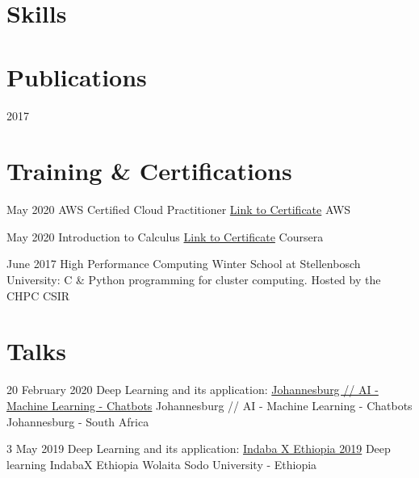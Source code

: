 \documentclass[letterpaper]{moderncv}        %
\begin{document}
\section{Skills}
			
\vspace{1mm}


	
\section{Publications}
\cventry
{2017}
{}
{}
{}
{}
{}

\section{Training \& Certifications}

\cventry
{May 2020}
{AWS Certified Cloud Practitioner}
{\href{https://www.certmetrics.com/amazon/public/badge.aspx?i=9&t=c&d=2020-05-30&ci=AWS01387974}{Link to Certificate}}
{AWS}
{}
{}

\cventry
{May 2020}
{Introduction to Calculus}
{\href{https://www.coursera.org/account/accomplishments/verify/VNY949FASZA2}{Link to Certificate}}
{Coursera}
{}
{}

\cventry
{June 2017}
{High Performance Computing Winter School at Stellenbosch University: C \& Python programming for cluster computing.}
{Hosted by the CHPC}
{CSIR}
{}
{}

\section{Talks}

\cventry
{20 February 2020}
{Deep Learning and its application: \href{https://www.meetup.com/Johannesburg-Artificial-Intelligence-Meetup/events/268234198/}{Johannesburg // AI - Machine Learning - Chatbots}}
{Johannesburg // AI - Machine Learning - Chatbots}
{Johannesburg - South Africa}
{}
{}


\cventry
{3 May 2019}
{Deep Learning and its application: \href{https://sites.google.com/view/indabaxethiopia2019/speakers?authuser=0}{Indaba X Ethiopia 2019}}
{Deep learning IndabaX Ethiopia}
{Wolaita Sodo University - Ethiopia}
{}
{}
\end{document}
